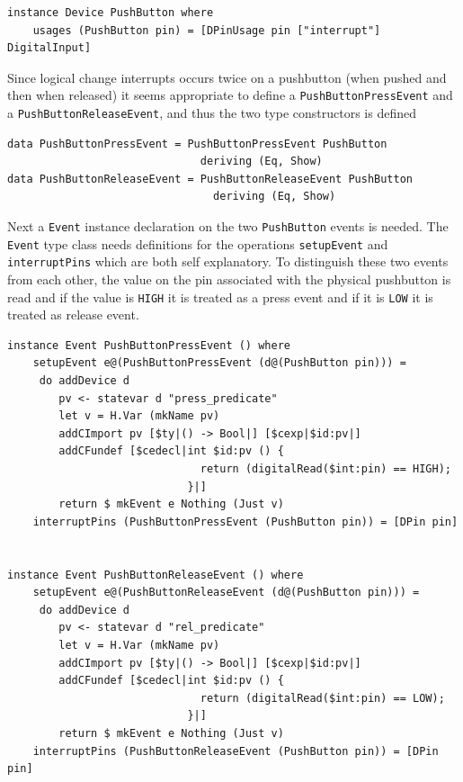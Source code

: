 \documentclass[a4paper, oneside, final]{memoir}
\begin{document}
\begin{verbatim}
instance Device PushButton where
    usages (PushButton pin) = [DPinUsage pin ["interrupt"] DigitalInput]
\end{verbatim}

Since logical change interrupts occurs twice on a pushbutton (when
pushed and then when released) it seems appropriate to define a
\texttt{PushButtonPressEvent} and a \texttt{PushButtonReleaseEvent},
and thus the two type constructors is defined

\begin{verbatim}
data PushButtonPressEvent = PushButtonPressEvent PushButton
                              deriving (Eq, Show)
data PushButtonReleaseEvent = PushButtonReleaseEvent PushButton
                                deriving (Eq, Show)
\end{verbatim}

\noindent
Next a \texttt{Event} instance declaration on the two \texttt{PushButton} events
is needed. The \texttt{Event} type class needs definitions for the operations
\texttt{setupEvent} and \texttt{interruptPins} which are both self
explanatory. To distinguish these two events from each other, the value on the
pin associated with the physical pushbutton is read and if the value is
\texttt{HIGH} it is treated as a press event and if it is \texttt{LOW} it is
treated as release event.

\begin{verbatim}
instance Event PushButtonPressEvent () where
    setupEvent e@(PushButtonPressEvent (d@(PushButton pin))) = 
     do addDevice d
        pv <- statevar d "press_predicate" 
        let v = H.Var (mkName pv)
        addCImport pv [$ty|() -> Bool|] [$cexp|$id:pv|]
        addCFundef [$cedecl|int $id:pv () {
                              return (digitalRead($int:pin) == HIGH);
                            }|]
        return $ mkEvent e Nothing (Just v)
    interruptPins (PushButtonPressEvent (PushButton pin)) = [DPin pin]


instance Event PushButtonReleaseEvent () where
    setupEvent e@(PushButtonReleaseEvent (d@(PushButton pin))) = 
     do addDevice d 
        pv <- statevar d "rel_predicate" 
        let v = H.Var (mkName pv)
        addCImport pv [$ty|() -> Bool|] [$cexp|$id:pv|]
        addCFundef [$cedecl|int $id:pv () {
                              return (digitalRead($int:pin) == LOW);
                            }|]
        return $ mkEvent e Nothing (Just v)
    interruptPins (PushButtonReleaseEvent (PushButton pin)) = [DPin pin]
\end{verbatim}
\end{document}

